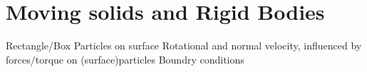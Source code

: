 \section{Moving solids and Rigid Bodies}
	Rectangle/Box
	Particles on surface
	Rotational and normal velocity, influenced by forces/torque on (surface)particles
	Boundry conditions 